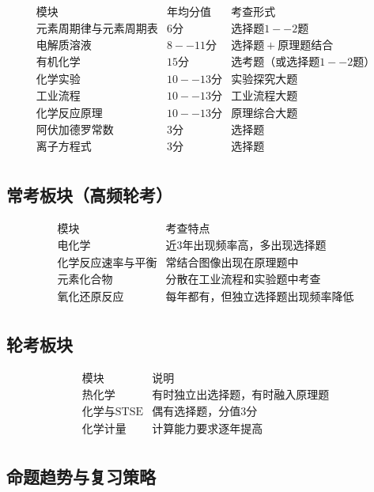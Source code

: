 \[
\begin{array}{c|c|c}
\text{模块} & \text{年均分值} & \text{考查形式} \\ \hline
\text{元素周期律与元素周期表} & 6 分 & 选择题 1--2 题 \\
\text{电解质溶液} & 8--11 分 & 选择题 + 原理题结合 \\
\text{有机化学} & 15 分 & 选考题（或选择题 1--2 题） \\
\text{化学实验} & 10--13 分 & 实验探究大题 \\
\text{工业流程} & 10--13 分 & 工业流程大题 \\
\text{化学反应原理} & 10--13 分 & 原理综合大题 \\
\text{阿伏加德罗常数} & 3 分 & 选择题 \\
\text{离子方程式} & 3 分 & 选择题 \\
\end{array}
\]

\subsection{常考板块（高频轮考）}

\[
\begin{array}{c|c}
\text{模块} & \text{考查特点} \\ \hline
\text{电化学} & 近 3 年出现频率高，多出现选择题 \\
\text{化学反应速率与平衡} & 常结合图像出现在原理题中 \\
\text{元素化合物} & 分散在工业流程和实验题中考查 \\
\text{氧化还原反应} & 每年都有，但独立选择题出现频率降低 \\
\end{array}
\]

\subsection{轮考板块}

\[
\begin{array}{c|c}
\text{模块} & \text{说明} \\ \hline
\text{热化学} & 有时独立出选择题，有时融入原理题 \\
\text{化学与STSE} & 偶有选择题，分值 3 分 \\
\text{化学计量} & 计算能力要求逐年提高 \\
\end{array}
\]

\subsection{命题趋势与复习策略}

